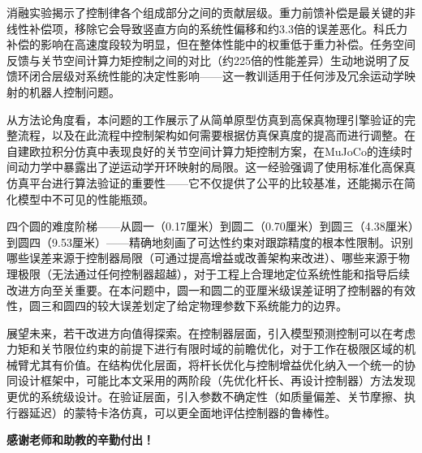\documentclass{article}
\begin{document}
消融实验揭示了控制律各个组成部分之间的贡献层级。重力前馈补偿是最关键的非线性补偿项，移除它会导致竖直方向的系统性偏移和约3.3倍的误差恶化。科氏力补偿的影响在高速度段较为明显，但在整体性能中的权重低于重力补偿。任务空间反馈与关节空间计算力矩控制之间的对比（约225倍的性能差异）生动地说明了反馈环闭合层级对系统性能的决定性影响——这一教训适用于任何涉及冗余运动学映射的机器人控制问题。

从方法论角度看，本问题的工作展示了从简单原型仿真到高保真物理引擎验证的完整流程，以及在此流程中控制架构如何需要根据仿真保真度的提高而进行调整。在自建欧拉积分仿真中表现良好的关节空间计算力矩控制方案，在MuJoCo的连续时间动力学中暴露出了逆运动学开环映射的局限。这一经验强调了使用标准化高保真仿真平台进行算法验证的重要性——它不仅提供了公平的比较基准，还能揭示在简化模型中不可见的性能瓶颈。

四个圆的难度阶梯——从圆一（0.17厘米）到圆二（0.70厘米）到圆三（4.38厘米）到圆四（9.53厘米）——精确地刻画了可达性约束对跟踪精度的根本性限制。识别哪些误差来源于控制器局限（可通过提高增益或改善架构来改进）、哪些来源于物理极限（无法通过任何控制器超越），对于工程上合理地定位系统性能和指导后续改进方向至关重要。在本问题中，圆一和圆二的亚厘米级误差证明了控制器的有效性，圆三和圆四的较大误差划定了给定物理参数下系统能力的边界。

展望未来，若干改进方向值得探索。在控制器层面，引入模型预测控制可以在考虑力矩和关节限位约束的前提下进行有限时域的前瞻优化，对于工作在极限区域的机械臂尤其有价值。在结构优化层面，将杆长优化与控制增益优化纳入一个统一的协同设计框架中，可能比本文采用的两阶段（先优化杆长、再设计控制器）方法发现更优的系统级设计。在验证层面，引入参数不确定性（如质量偏差、关节摩擦、执行器延迟）的蒙特卡洛仿真，可以更全面地评估控制器的鲁棒性。

\vspace{3em}
\begin{center}
\textbf{感谢老师和助教的辛勤付出！}
\end{center}
\end{document}
